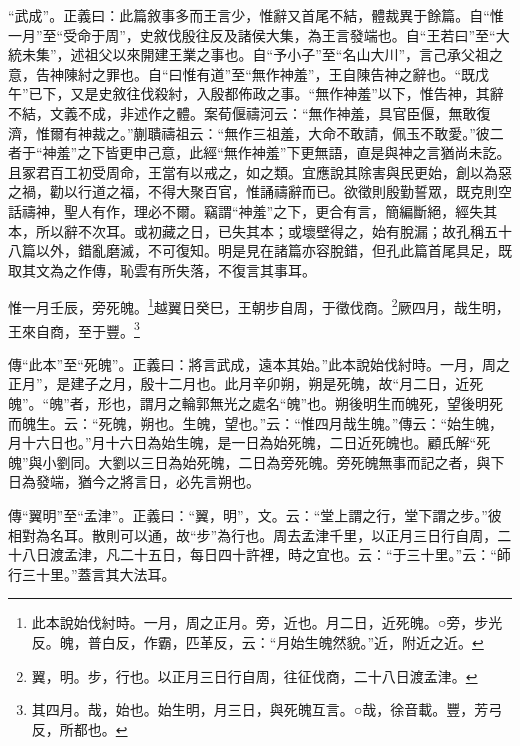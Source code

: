 {\noindent\shu{}\fzkt “武成”。正義曰：此篇敘事多而王言少，惟辭又首尾不結，體裁異于餘篇。自“惟一月”至“受命于周”，史敘伐殷往反及諸侯大集，為王言發端也。自“王若曰”至“大統未集”，述祖父以來開建王業之事也。自“予小子”至“名山大川”，言己承父祖之意，告神陳紂之罪也。自“曰惟有道”至“無作神羞”，王自陳告神之辭也。“既戊午”已下，又是史敘往伐殺紂，入殷都佈政之事。“無作神羞”以下，惟告神，其辭不結，文義不成，非述作之體。案荀偃禱河云：“無作神羞，具官臣偃，無敢復濟，惟爾有神裁之。”蒯聵禱祖云：“無作三祖羞，大命不敢請，佩玉不敢愛。”彼二者于“神羞”之下皆更申己意，此經“無作神羞”下更無語，直是與神之言猶尚未訖。且冢君百工初受周命，王當有以戒之，如之類。宜應說其除害與民更始，創以為惡之禍，勸以行道之福，不得大聚百官，惟誦禱辭而已。欲徵則殷勤誓眾，既克則空話禱神，聖人有作，理必不爾。竊謂“神羞”之下，更合有言，簡編斷絕，經失其本，所以辭不次耳。或初藏之日，已失其本；或壞壁得之，始有脫漏；故孔稱五十八篇以外，錯亂磨滅，不可復知。明是見在諸篇亦容脫錯，但孔此篇首尾具足，既取其文為之作傳，恥雲有所失落，不復言其事耳。 \par}

惟一月壬辰，旁死魄。\footnote{此本說始伐紂時。一月，周之正月。旁，近也。月二日，近死魄。○旁，步光反。魄，普白反，作霸，匹革反，云：“月始生魄然貌。”近，附近之近。}越翼日癸巳，王朝步自周，于徵伐商。\footnote{翼，明。步，行也。以正月三日行自周，往征伐商，二十八日渡孟津。}厥四月，哉生明，王來自商，至于豐。\footnote{其四月。哉，始也。始生明，月三日，與死魄互言。○哉，徐音載。豐，芳弓反，所都也。}


{\noindent\zhuan{}\fzbyks 傳“此本”至“死魄”。正義曰：將言武成，遠本其始。”此本說始伐紂時。一月，周之正月”，是建子之月，殷十二月也。此月辛卯朔，朔是死魄，故“月二日，近死魄”。“魄”者，形也，謂月之輪郭無光之處名“魄”也。朔後明生而魄死，望後明死而魄生。云：“死魄，朔也。生魄，望也。”云：“惟四月哉生魄。”傳云：“始生魄，月十六日也。”月十六日為始生魄，是一日為始死魄，二日近死魄也。顧氏解“死魄”與小劉同。大劉以三日為始死魄，二日為旁死魄。旁死魄無事而記之者，與下日為發端，猶今之將言日，必先言朔也。 \par}

{\noindent\zhuan{}\fzbyks 傳“翼明”至“孟津”。正義曰：“翼，明”，文。云：“堂上謂之行，堂下謂之步。”彼相對為名耳。散則可以通，故“步”為行也。周去孟津千里，以正月三日行自周，二十八日渡孟津，凡二十五日，每日四十許裡，時之宜也。云：“于三十里。”云：“師行三十里。”蓋言其大法耳。 \par}

